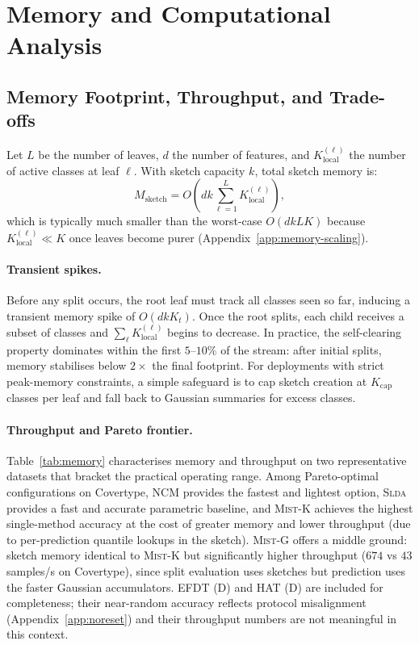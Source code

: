 \documentclass{article}
\newcommand{\mist}{\textsc{Mist}}
\newcommand{\slda}{\textsc{Slda}}
\begin{document}
\section{Memory and Computational Analysis}
\label{app:memory-all}

\subsection{Memory Footprint, Throughput, and Trade-offs}
\label{app:memory-full}

Let $L$ be the number of leaves, $d$ the number of features, and
$K_{\mathrm{local}}^{(\ell)}$ the number of active classes at leaf $\ell$.
With sketch capacity $k$, total sketch memory is:
\[
  M_{\mathrm{sketch}}
  = O\!\left(dk\sum_{\ell=1}^{L} K_{\mathrm{local}}^{(\ell)}\right),
\]
which is typically much smaller than the worst-case $O(dkLK)$ because
$K_{\mathrm{local}}^{(\ell)} \ll K$ once leaves become purer
(Appendix~\ref{app:memory-scaling}).

\paragraph{Transient spikes.}
Before any split occurs, the root leaf must track all classes seen so far,
inducing a transient memory spike of $O(dkK_t)$. Once the root splits, each
child receives a subset of classes and $\sum_\ell K_{\mathrm{local}}^{(\ell)}$
begins to decrease. In practice, the self-clearing property dominates within
the first $5$--$10\%$ of the stream: after initial splits, memory stabilises
below $2\times$ the final footprint. For deployments with strict peak-memory
constraints, a simple safeguard is to cap sketch creation at $K_{\mathrm{cap}}$
classes per leaf and fall back to Gaussian summaries for excess classes.

\paragraph{Throughput and Pareto frontier.}
Table~\ref{tab:memory} characterises memory and throughput on two
representative datasets that bracket the practical operating range. Among
Pareto-optimal configurations on Covertype, NCM provides the fastest and
lightest option, \slda{} provides a fast and accurate parametric baseline,
and \mist{}-K achieves the highest single-method accuracy at the cost of
greater memory and lower throughput (due to per-prediction quantile lookups
in the sketch). \mist{}-G offers a middle ground: sketch memory identical to
\mist{}-K but significantly higher throughput ($674$ vs $43$ samples/s on
Covertype), since split evaluation uses sketches but prediction uses the
faster Gaussian accumulators. EFDT (D) and HAT (D) are included for
completeness; their near-random accuracy reflects protocol misalignment
(Appendix~\ref{app:noreset}) and their throughput numbers are not meaningful
in this context.
\end{document}
